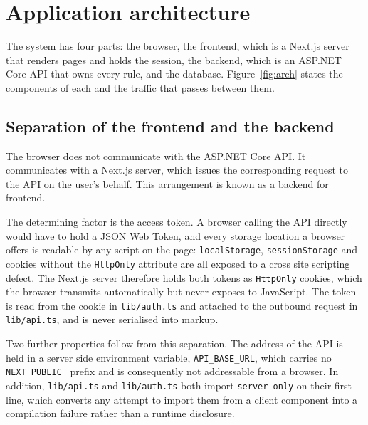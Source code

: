 \documentclass[11pt,a4paper]{article}
\newcommand{\code}[1]{\texttt{\fontsize{8.6}{10}\selectfont #1}}
\begin{document}
\section{Application architecture}

The system has four parts: the browser, the frontend, which is a Next.js server
that renders pages and holds the session, the backend, which is an ASP.NET Core
API that owns every rule, and the database. Figure~\ref{fig:arch} states the
components of each and the traffic that passes between them.

\subsection{Separation of the frontend and the backend}

The browser does not communicate with the ASP.NET Core API. It communicates
with a Next.js server, which issues the corresponding request to the API on the
user's behalf. This arrangement is known as a backend for frontend.

The determining factor is the access token. A browser calling the API directly
would have to hold a JSON Web Token, and every storage location a browser
offers is readable by any script on the page: \code{localStorage},
\code{sessionStorage} and cookies without the \code{HttpOnly} attribute are all
exposed to a cross site scripting defect. The Next.js server therefore holds
both tokens as \code{HttpOnly} cookies, which the browser transmits
automatically but never exposes to JavaScript. The token is read from the cookie
in \code{lib/auth.ts} and attached to the outbound request in \code{lib/api.ts},
and is never serialised into markup.

Two further properties follow from this separation. The address of the API is
held in a server side environment variable, \code{API\_BASE\_URL}, which carries
no \code{NEXT\_PUBLIC\_} prefix and is consequently not addressable from a
browser. In addition, \code{lib/api.ts} and \code{lib/auth.ts} both import
\code{server-only} on their first line, which converts any attempt to import
them from a client component into a compilation failure rather than a runtime
disclosure.
\end{document}
